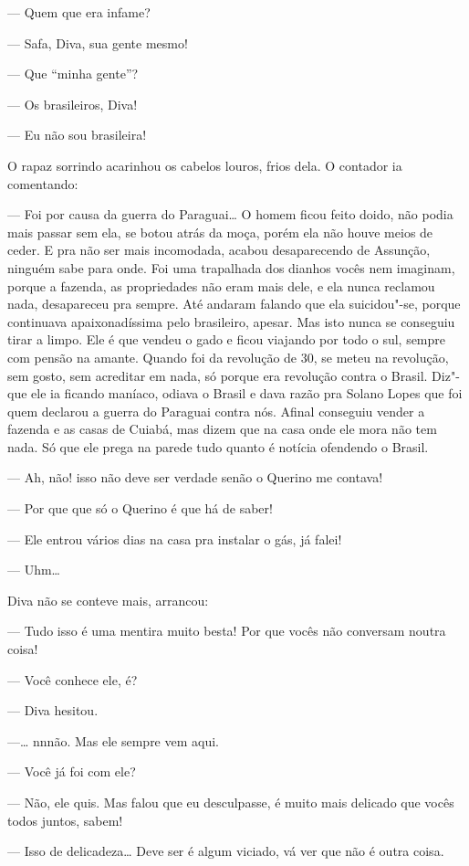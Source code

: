 --- Quem que era infame?

--- Safa, Diva, sua gente mesmo!

--- Que ``minha gente''?

--- Os brasileiros, Diva!

--- Eu não sou brasileira!

O rapaz sorrindo acarinhou os cabelos louros, frios dela. O contador ia
comentando:

--- Foi por causa da guerra do Paraguai\ldots{} O homem ficou feito doido,
não podia mais passar sem ela, se botou atrás da moça, porém ela não
houve meios de ceder. E pra não ser mais incomodada, acabou
desaparecendo de Assunção, ninguém sabe para onde. Foi uma trapalhada
dos dianhos vocês nem imaginam, porque a fazenda, as propriedades não
eram mais dele, e ela nunca reclamou nada, desapareceu pra sempre. Até
andaram falando que ela suicidou"-se, porque continuava apaixonadíssima
pelo brasileiro, apesar. Mas isto nunca se conseguiu tirar a limpo. Ele
é que vendeu o gado e ficou viajando por todo o sul, sempre com pensão
na amante. Quando foi da revolução de 30, se meteu na revolução, sem
gosto, sem acreditar em nada, só porque era revolução contra o Brasil.
Diz"-que ele ia ficando maníaco, odiava o Brasil e dava razão pra Solano
Lopes que foi quem declarou a guerra do Paraguai contra nós. Afinal
conseguiu vender a fazenda e as casas de Cuiabá, mas dizem que na casa
onde ele mora não tem nada. Só que ele prega na parede tudo quanto é
notícia ofendendo o Brasil.

--- Ah, não! isso não deve ser verdade senão o Querino me contava!

--- Por que que só o Querino é que há de saber!

--- Ele entrou vários dias na casa pra instalar o gás, já falei!

--- Uhm\ldots{}

Diva não se conteve mais, arrancou:

--- Tudo isso é uma mentira muito besta! Por que vocês não conversam
noutra coisa!

--- Você conhece ele, é?

--- Diva hesitou.

---\ldots{} nnnão. Mas ele sempre vem aqui.

--- Você já foi com ele?

--- Não, ele quis. Mas falou que eu desculpasse, é muito mais delicado
que vocês todos juntos, sabem!

--- Isso de delicadeza\ldots{} Deve ser é algum viciado, vá ver que não é
outra coisa.

